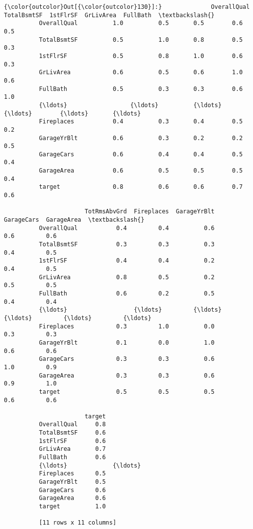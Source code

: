 \documentclass[11pt]{article}
\begin{document}
\begin{Verbatim}[commandchars=\\\{\}]
{\color{outcolor}Out[{\color{outcolor}130}]:}              OverallQual  TotalBsmtSF  1stFlrSF  GrLivArea  FullBath  \textbackslash{}
          OverallQual          1.0          0.5       0.5        0.6       0.5   
          TotalBsmtSF          0.5          1.0       0.8        0.5       0.3   
          1stFlrSF             0.5          0.8       1.0        0.6       0.3   
          GrLivArea            0.6          0.5       0.6        1.0       0.6   
          FullBath             0.5          0.3       0.3        0.6       1.0   
          {\ldots}                  {\ldots}          {\ldots}       {\ldots}        {\ldots}       {\ldots}   
          Fireplaces           0.4          0.3       0.4        0.5       0.2   
          GarageYrBlt          0.6          0.3       0.2        0.2       0.5   
          GarageCars           0.6          0.4       0.4        0.5       0.4   
          GarageArea           0.6          0.5       0.5        0.5       0.4   
          target               0.8          0.6       0.6        0.7       0.6   
          
                       TotRmsAbvGrd  Fireplaces  GarageYrBlt  GarageCars  GarageArea  \textbackslash{}
          OverallQual           0.4         0.4          0.6         0.6         0.6   
          TotalBsmtSF           0.3         0.3          0.3         0.4         0.5   
          1stFlrSF              0.4         0.4          0.2         0.4         0.5   
          GrLivArea             0.8         0.5          0.2         0.5         0.5   
          FullBath              0.6         0.2          0.5         0.4         0.4   
          {\ldots}                   {\ldots}         {\ldots}          {\ldots}         {\ldots}         {\ldots}   
          Fireplaces            0.3         1.0          0.0         0.3         0.3   
          GarageYrBlt           0.1         0.0          1.0         0.6         0.6   
          GarageCars            0.3         0.3          0.6         1.0         0.9   
          GarageArea            0.3         0.3          0.6         0.9         1.0   
          target                0.5         0.5          0.5         0.6         0.6   
          
                       target  
          OverallQual     0.8  
          TotalBsmtSF     0.6  
          1stFlrSF        0.6  
          GrLivArea       0.7  
          FullBath        0.6  
          {\ldots}             {\ldots}  
          Fireplaces      0.5  
          GarageYrBlt     0.5  
          GarageCars      0.6  
          GarageArea      0.6  
          target          1.0  
          
          [11 rows x 11 columns]
\end{Verbatim}
            
\end{document}
